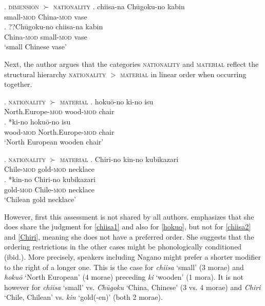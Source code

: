\documentclass [output=book,colorlinks,citecolor=brown]{langscibook}
\begin{document}
\ex. \textsc{dimension} $\succ$ \textsc{nationality}
\label{chiisa2} \ag. chiisa-na Chūgoku-no kabin\\
small-\textsc{mod} China-\textsc{mod} vase\\
\bg. ??Chūgoku-no chiisa-na kabin\\
China-\textsc{mod} small-\textsc{mod} vase\\
`small Chinese vase' \hfill \citep[507]{watanabe:2012:direct}

Next, the author argues that the categories \textsc{nationality} and \textsc{material} reflect the structural hierarchy \textsc{nationality} $>$ \textsc{material} in linear order when occurring together.


\ex. \textsc{nationality} $\succ$ \textsc{material}
\label{hokuo} \ag. hokuō-no ki-no isu \\
North.Europe-\textsc{mod} wood-\textsc{mod} chair\\
\bg. *ki-no hokuō-no isu\\
wood-\textsc{mod} North.Europe-\textsc{mod} chair\\
`North European wooden chair' \hfill \citep[508]{watanabe:2012:direct}

\ex. \textsc{nationality} $\succ$ \textsc{material}
\label{Chiri} \ag. Chiri-no kin-no kubikazari\\
Chile-\textsc{mod} gold-\textsc{mod} necklace\\
\bg. *kin-no Chiri-no kubikazari\\
gold-\textsc{mod} Chile-\textsc{mod} necklace\\
`Chilean gold necklace' \hfill \citep[508]{watanabe:2012:direct}

However, first this assessment is not shared by all authors. \citet[Fn. 14]{nagano:2016:are} emphasizes that she does share the judgment for \ref{chiisa1} and also for \ref{hokuo}, but not for \ref{chiisa2} and \ref{Chiri}, meaning she does not have a preferred order. She suggests that the ordering restrictions in the other cases might be phonologically conditioned (ibid.). More precisely, speakers including Nagano might prefer a shorter modifier to the right of a longer one. This is the case for \textit{chiisa} `small' (3 morae) and \textit{hokuō} `North European' (4 morae) preceding \textit{ki} `wooden' (1 mora). It is not however for \textit{chiisa} `small' vs. \textit{Chūgoku} `China, Chinese' (3 vs. 4 morae) and \textit{Chiri} `Chile, Chilean' vs. \textit{kin} `gold(-en)' (both 2 morae). %
\end{document}
